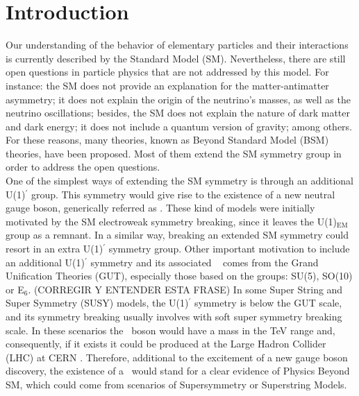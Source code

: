 \chapter*{Introduction}

Our understanding of the behavior of elementary particles and their interactions is 
currently described by the Standard Model (SM). Nevertheless, there are still open 
questions in particle physics that are not addressed by this model. For instance: the SM does 
not provide an explanation for the matter-antimatter asymmetry; it does not 
explain the origin of the neutrino's masses, as well as the 
neutrino oscillations; besides, the SM does not explain the nature of dark matter and dark energy;
it does not include a quantum version of gravity; among others. For these reasons, 
many theories, known as Beyond Standard Model (BSM) \cite{BSM} theories, have been proposed.
Most of them extend the SM symmetry group in order to address the open questions. \\

One of the simplest ways of extending the SM symmetry is through an additional
U(1)$^{\prime}$ group. This symmetry would give rise to the existence of a 
new neutral gauge boson, generically referred as \Zprime. These kind of models were initially 
motivated by the SM electroweak symmetry breaking, since it leaves the U(1)$_{\text{EM}}$ group as a remnant. In a similar way, breaking 
an extended SM symmetry could resort in an extra U(1)$^{\prime}$ symmetry group. Other 
important motivation to include an additional U(1)$^{\prime}$ symmetry and its associated 
\Zprime~ comes from the Grand Unification Theories (GUT), especially those 
based on the groups: SU(5), SO(10) or E$_6$. (CORREGIR Y ENTENDER ESTA FRASE) In some Super 
String and Super Symmetry (SUSY) models, the U(1)$^{\prime}$ symmetry is 
below the GUT scale, and its symmetry breaking usually 
involves with soft super symmetry breaking scale. 
In these scenarios the \Zprime~boson would have a mass in the TeV range and, consequently, if it exists it
could be produced at the Large Hadron Collider (LHC) at CERN \cite{Langacker:2008yv}. Therefore, additional to
the excitement of a new gauge boson discovery, the existence of a \Zprime~would stand for a clear 
evidence of Physics Beyond SM, which could come from scenarios of Supersymmetry or Superstring Models. \\
  
